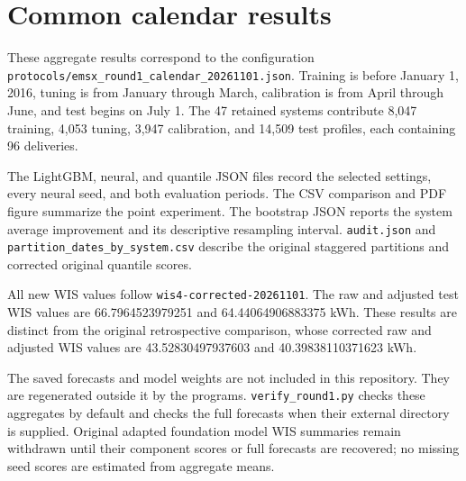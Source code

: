 \section*{Common calendar results}

These aggregate results correspond to the configuration
\texttt{protocols/emsx\_round1\_calendar\_20261101.json}. Training is before
January 1, 2016, tuning is from January through March, calibration is from April
through June, and test begins on July 1. The 47 retained systems contribute
8,047 training, 4,053 tuning, 3,947 calibration, and 14,509 test profiles, each
containing 96 deliveries.

The LightGBM, neural, and quantile JSON files record the selected settings,
every neural seed, and both evaluation periods. The CSV comparison and PDF
figure summarize the point experiment. The bootstrap JSON reports the
system average improvement and its descriptive resampling interval.
\texttt{audit.json} and \texttt{partition\_dates\_by\_system.csv} describe the
original staggered partitions and corrected original quantile scores.

All new WIS values follow \texttt{wis4-corrected-20261101}. The raw and adjusted
test WIS values are 66.7964523979251 and 64.44064906883375 kWh. These results are
distinct from the original retrospective comparison, whose corrected raw and
adjusted WIS values are 43.52830497937603 and 40.39838110371623 kWh.

The saved forecasts and model weights are not included in this repository.
They are regenerated outside it by the programs. \texttt{verify\_round1.py}
checks these aggregates by default and checks the full forecasts when their
external directory is supplied. Original adapted foundation model WIS summaries
remain withdrawn until their component scores or full forecasts are recovered;
no missing seed scores are estimated from aggregate means.
